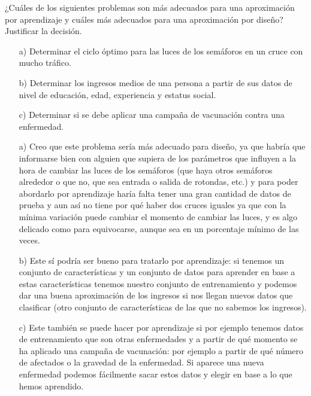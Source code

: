 \documentclass[12pt]{article}
\theoremstyle{definition}
\begin{document}
\begin{pregunta}
¿Cuáles de los siguientes problemas son más adecuados para una aproximación por aprendizaje y cuáles más adecuados para una aproximación por diseño? Justificar la decisión.
\begin{enumerate}
\item[a)] Determinar el ciclo óptimo para las luces de los semáforos en un cruce con mucho tráfico.
\item[b)] Determinar los ingresos medios de una persona a partir de sus datos de nivel de educación, edad, experiencia y estatus social.
\item[c)] Determinar si se debe aplicar una campaña de vacunación contra una enfermedad.
\end{enumerate}

\begin{enumerate}
\item[a)] Creo que este problema sería más adecuado para diseño, ya que habría que informarse bien con alguien que supiera de los parámetros que influyen a la hora de cambiar las luces de los semáforos (que haya otros semáforos alrededor o que no, que sea entrada o salida de rotondas, etc.) y para poder abordarlo por aprendizaje haría falta tener una gran cantidad de datos de prueba y aun así no tiene por qué haber dos cruces iguales ya que con la mínima variación puede cambiar el momento de cambiar las luces, y es algo delicado como para equivocarse, aunque sea en un porcentaje mínimo de las veces.
\item[b)] Este sí podría ser bueno para tratarlo por aprendizaje: si tenemos un conjunto de características y un conjunto de datos para aprender en base a estas características tenemos nuestro conjunto de entrenamiento y podemos dar una buena aproximación de los ingresos si nos llegan nuevos datos que clasificar (otro conjunto de características de las que no sabemos los ingresos).
\item[c)] Este también se puede hacer por aprendizaje si por ejemplo tenemos datos de entrenamiento que son otras enfermedades y a partir de qué momento se ha aplicado una campaña de vacunación: por ejemplo a partir de qué número de afectados o la gravedad de la enfermedad. Si aparece una nueva enfermedad podemos fácilmente sacar estos datos y elegir en base a lo que hemos aprendido.
\end{enumerate}

\end{pregunta}
\end{document}
